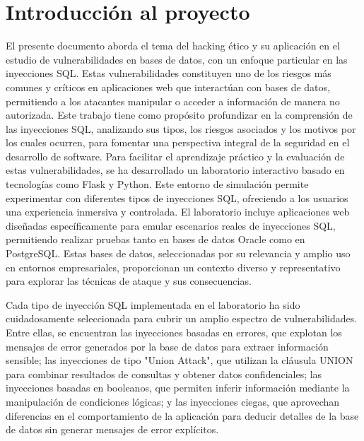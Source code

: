 \documentclass[a4paper,12pt]{article}
\begin{document}
\newpage

\begin{center}
    \renewcommand{\contentsname}{Índice de contenidos}\tableofcontents
\end{center}

\newpage

\section{Introducción al proyecto}
El presente documento aborda el tema del hacking ético y su aplicación en el estudio de vulnerabilidades en bases 
de datos, con un enfoque particular en las inyecciones SQL. Estas vulnerabilidades constituyen uno de los riesgos 
más comunes y críticos en aplicaciones web que interactúan con bases de datos, permitiendo a los atacantes manipular 
o acceder a información de manera no autorizada. Este trabajo tiene como propósito profundizar en la comprensión de las 
inyecciones SQL, analizando sus tipos, los riesgos asociados y los motivos por los cuales ocurren, para fomentar una perspectiva 
integral de la seguridad en el desarrollo de software.
\vspace{0,5cm}
Para facilitar el aprendizaje práctico y la evaluación de estas vulnerabilidades, se ha desarrollado un laboratorio interactivo 
basado en tecnologías como Flask y Python. Este entorno de simulación permite experimentar con diferentes tipos de inyecciones SQL,
 ofreciendo a los usuarios una experiencia inmersiva y controlada. El laboratorio incluye aplicaciones web diseñadas específicamente
  para emular escenarios reales de inyecciones SQL, permitiendo realizar pruebas tanto en bases de datos Oracle como en PostgreSQL.
   Estas bases de datos, seleccionadas por su relevancia y amplio uso en entornos empresariales, proporcionan un contexto diverso y
    representativo para explorar las técnicas de ataque y sus consecuencias.
    \vspace{0,5cm}

Cada tipo de inyección SQL implementada en el laboratorio ha sido cuidadosamente seleccionada para cubrir un amplio espectro de 
vulnerabilidades. Entre ellas, se encuentran las inyecciones basadas en errores, que explotan los mensajes de error generados por
 la base de datos para extraer información sensible; las inyecciones de tipo "Union Attack", que utilizan la cláusula UNION para 
 combinar resultados de consultas y obtener datos confidenciales; las inyecciones basadas en booleanos, que permiten inferir 
 información mediante la manipulación de condiciones lógicas; y las inyecciones ciegas, que aprovechan diferencias en el 
 comportamiento de la aplicación para deducir detalles de la base de datos sin generar mensajes de error explícitos.
 \vspace{0,5cm}
\end{document}
